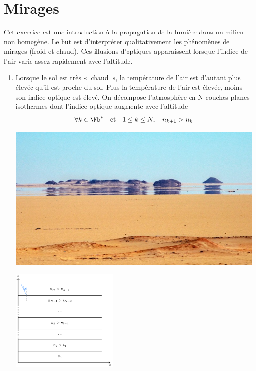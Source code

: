 \documentclass[../../main/main.tex]{subfiles}
\begin{document}
\section{Mirages}

Cet exercice est une introduction à la propagation de la lumière dans un milieu
non homogène. Le but est d'interpréter qualitativement les phénomènes de mirages
(froid et chaud). Ces illusions d'optiques apparaissent lorsque l'indice de
l'air varie assez rapidement avec l'altitude.
\begin{enumerate}
	\item Lorsque le sol est très «~chaud~», la température de l'air est
	      d'autant plus élevée qu'il est proche du sol. Plus la température de
	      l'air est élevée, moins son indice optique est élevé. On décompose
	      l'atmosphère en N couches planes isothermes dont l'indice optique
	      augmente avec l'altitude~:
	      \[ \forall k \in \Nb^* \quad\text{et}\quad 1 \leq k \leq N,
		      \quad n_{k+1} > n_k\]
	      \begin{minipage}{0.47\linewidth}
		      \begin{center}
			      \includegraphics[width=\linewidth]{mirage_chaud}
			      \label{fig:mir_chaud}
		      \end{center}
	      \end{minipage}
	      \hfill
	      \begin{minipage}{0.47\linewidth}
		      \begin{center}
			      \centering
			      \includegraphics[height=5cm]{mirage_plain.pdf}

\end{center}
\end{minipage}
\end{enumerate}
\end{document}
